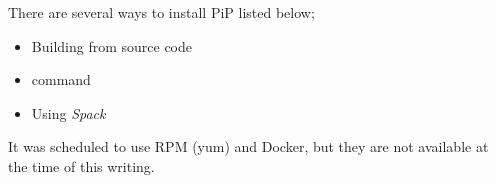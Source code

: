 
There are several ways to install PiP listed below;

\begin{itemize}
\item Building from source code
\item {} command
\item Using \em{Spack}
\end{itemize}

It was scheduled to use RPM (yum) and Docker, but 
they are not available at the time of this writing.
